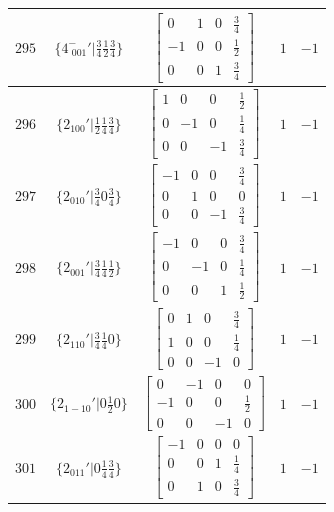 \documentclass[fleqn,8pt]{jsarticle}
\begin{document}
\begin{longtable}{ccccc}
$ 295 $ & $ \{4^{-}_{\,\,001}{}'|\frac{3}{4} \frac{1}{2} \frac{3}{4}\} $ & $ \begin{bmatrix} 0 & 1 & 0 & \frac{3}{4} \\ -1 & 0 & 0 & \frac{1}{2} \\ 0 & 0 & 1 & \frac{3}{4} \end{bmatrix} $ & $ 1 $ & $ -1 $ \\ \hline
$ 296 $ & $ \{2{}_{100}{}'|\frac{1}{2} \frac{1}{4} \frac{3}{4}\} $ & $ \begin{bmatrix} 1 & 0 & 0 & \frac{1}{2} \\ 0 & -1 & 0 & \frac{1}{4} \\ 0 & 0 & -1 & \frac{3}{4} \end{bmatrix} $ & $ 1 $ & $ -1 $ \\ \hline
$ 297 $ & $ \{2{}_{010}{}'|\frac{3}{4} 0 \frac{3}{4}\} $ & $ \begin{bmatrix} -1 & 0 & 0 & \frac{3}{4} \\ 0 & 1 & 0 & 0 \\ 0 & 0 & -1 & \frac{3}{4} \end{bmatrix} $ & $ 1 $ & $ -1 $ \\ \hline
$ 298 $ & $ \{2{}_{001}{}'|\frac{3}{4} \frac{1}{4} \frac{1}{2}\} $ & $ \begin{bmatrix} -1 & 0 & 0 & \frac{3}{4} \\ 0 & -1 & 0 & \frac{1}{4} \\ 0 & 0 & 1 & \frac{1}{2} \end{bmatrix} $ & $ 1 $ & $ -1 $ \\ \hline
$ 299 $ & $ \{2{}_{110}{}'|\frac{3}{4} \frac{1}{4} 0\} $ & $ \begin{bmatrix} 0 & 1 & 0 & \frac{3}{4} \\ 1 & 0 & 0 & \frac{1}{4} \\ 0 & 0 & -1 & 0 \end{bmatrix} $ & $ 1 $ & $ -1 $ \\ \hline
$ 300 $ & $ \{2{}_{1-10}{}'|0 \frac{1}{2} 0\} $ & $ \begin{bmatrix} 0 & -1 & 0 & 0 \\ -1 & 0 & 0 & \frac{1}{2} \\ 0 & 0 & -1 & 0 \end{bmatrix} $ & $ 1 $ & $ -1 $ \\ \hline
$ 301 $ & $ \{2{}_{011}{}'|0 \frac{1}{4} \frac{3}{4}\} $ & $ \begin{bmatrix} -1 & 0 & 0 & 0 \\ 0 & 0 & 1 & \frac{1}{4} \\ 0 & 1 & 0 & \frac{3}{4} \end{bmatrix} $ & $ 1 $ & $ -1 $ \\ \hline

\end{longtable}
\end{document}
